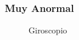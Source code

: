 \subsubsection{Muy Anormal}
\begin{figure}[htbp!]
	\centering
	\caption{Giroscopio}
	\label{fig:G4}
\end{figure}

